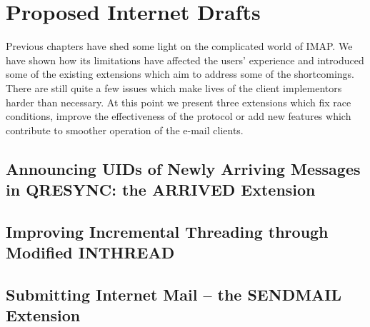 \documentclass[trojita]{subfiles}
\begin{document}
\chapter{Proposed Internet Drafts}

Previous chapters have shed some light on the complicated world of IMAP.  We have shown how its limitations have
affected the users' experience and introduced some of the existing extensions which aim to address some of the
shortcomings.  There are still quite a few issues which make lives of the client implementors harder than necessary.  At
this point we present three extensions which fix race conditions, improve the effectiveness of the protocol or add new
features which contribute to smoother operation of the e-mail clients.

\section{Announcing UIDs of Newly Arriving Messages in QRESYNC: the ARRIVED Extension}
\label{sec:draft-arrived}

\section{Improving Incremental Threading through Modified INTHREAD}
\label{sec:draft-inthread-ext}

\section{Submitting Internet Mail -- the SENDMAIL Extension}
\label{sec:draft-sendmail}
\end{document}
